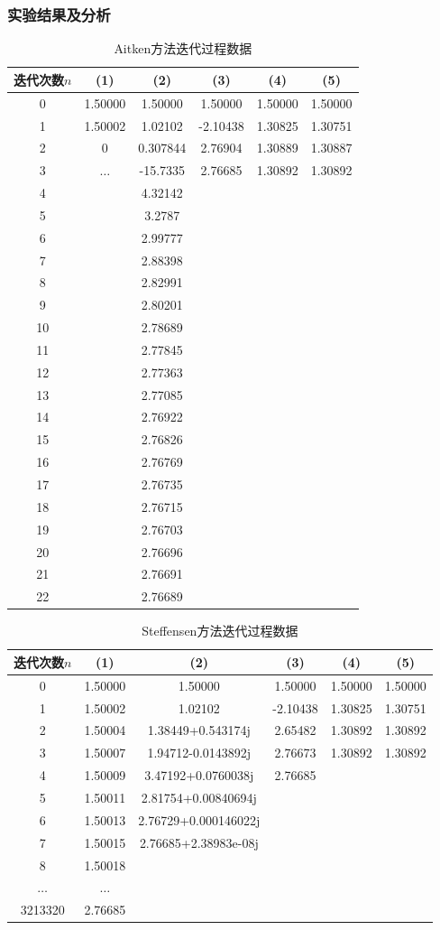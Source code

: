 \documentclass[UTF8]{ctexart}
\begin{document}
\subsubsection{实验结果及分析}
\begin{longtable}{cccccc}
  \caption{Aitken方法迭代过程数据}\\ \hline
  迭代次数$n$ & (1) & (2)& (3)& (4)& (5)\\
  \hline
  0 & 1.50000 & 1.50000 & 1.50000 & 1.50000 & 1.50000\\
  1	&1.50002&1.02102 &-2.10438 &1.30825&	1.30751\\
  2	&0	    &0.307844&2.76904	 &1.30889&	1.30887\\
  3	&$\dots$&-15.7335&2.76685	 &1.30892&	1.30892\\
  4 & & 4.32142& & & \\
  5 & &3.2787 & & & \\
  6 & &2.99777 & & & \\
  7 & &2.88398 & & & \\
  8 & &2.82991 & & & \\
  9 & &2.80201 & & & \\
  10 & &2.78689 & & & \\
  11& &2.77845 & & & \\
  12 & &2.77363 & & & \\
  13 & &2.77085 & & & \\
  14 & &2.76922 & & & \\
  15 & &2.76826 & & & \\
  16 & &2.76769 & & & \\
  17 & &2.76735 & & & \\
  18 & &2.76715 & & & \\
  19 & &2.76703 & & & \\
  20 & &2.76696 & & & \\
  21 & &2.76691 & & & \\
  22 & &2.76689 & & & \\
  \hline       
\end{longtable}

\begin{longtable}{cccccc}
  \caption{Steffensen方法迭代过程数据}\\ \hline
  迭代次数$n$ & (1) & (2)& (3)& (4)& (5)\\
  \hline
  0 & 1.50000 & 1.50000 & 1.50000 & 1.50000 & 1.50000\\
  1	&1.50002&1.02102 &-2.10438 &1.30825&	1.30751\\
  2	&1.50004&1.38449+0.543174j&2.65482&1.30892&1.30892\\
  3	&1.50007&1.94712-0.0143892j&2.76673&1.30892&1.30892\\
  4 &1.50009&3.47192+0.0760038j&2.76685 & & \\
  5 &1.50011&2.81754+0.00840694j & & & \\
  6 &1.50013 &2.76729+0.000146022j & & & \\
  7 &1.50015 &2.76685+2.38983e-08j & & & \\
  8 &1.50018 & & & & \\
  $\dots$ & $\dots$& & & &\\
  3213320&2.76685 & & & &\\
  \hline       
\end{longtable}
\end{document}
